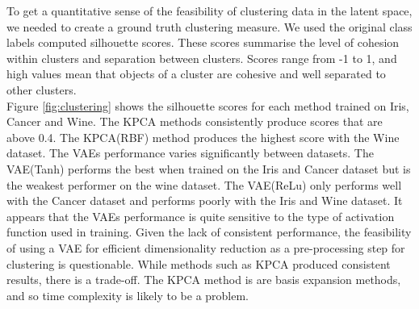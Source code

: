 \documentclass[12pt]{article}
\begin{document}
To get a quantitative sense of the feasibility of clustering data in the latent space, we needed to create a ground truth clustering measure. We used the original class labels computed silhouette scores. These scores summarise the level of cohesion within clusters and separation between clusters. Scores range from -1 to 1, and high values mean that objects of a cluster are cohesive and well separated to other clusters.\\

Figure \ref{fig:clustering} shows the silhouette scores for each method trained on Iris, Cancer and Wine. The KPCA methods consistently produce scores that are above 0.4. The KPCA(RBF) method produces the highest score with the Wine dataset. The VAEs performance varies significantly between datasets. The VAE(Tanh) performs the best when trained on the Iris and Cancer dataset but is the weakest performer on the wine dataset. The VAE(ReLu) only performs well with the Cancer dataset and performs poorly with the Iris and Wine dataset. It appears that the VAEs performance is quite sensitive to the type of activation function used in training. Given the lack of consistent performance, the feasibility of using a VAE for efficient dimensionality reduction as a pre-processing step for clustering is questionable. While methods such as KPCA produced consistent results, there is a trade-off. The KPCA method is are basis expansion methods, and so time complexity is likely to be a problem.

\end{document}
